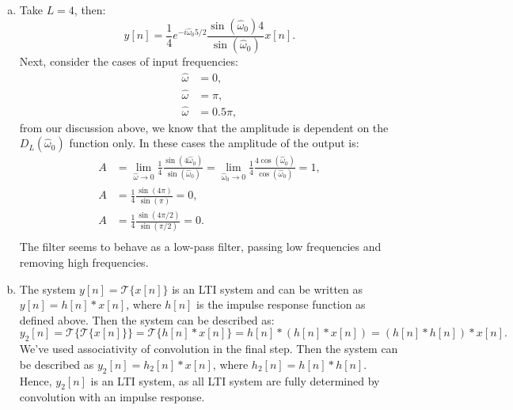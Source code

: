 \begin{enumerate}
\begin{enumerate}[a)]
\item Take $L=4$, then:
$$y[n]=\frac{1}{4}e^{-i\hat{\omega}_{0}5/2}\frac{\sin(\hat{\omega}_{0})4}{\sin(\hat{\omega}_{0})}x[n].$$
Next, consider the cases of input frequencies:
\begin{align*}
    \hat{\omega}&=0,\\
    \hat{\omega}&=\pi,\\
    \hat{\omega}&=0.5\pi,
\end{align*}
from our discussion above, we know that the amplitude is dependent on the $D_{L}(\hat{\omega}_{0})$ function only. 
In these cases the amplitude of the output is:
\begin{align*}
    A&=\lim_{\hat{\omega}\to 0}\frac{1}{4}\frac{\sin(4\hat{\omega}_{0})}{\sin(\hat{\omega}_{0})} = \lim_{\hat{\omega}_{0}\to 0}\frac{1}{4}\frac{4\cos(\hat{\omega}_{0})}{\cos(\hat{\omega}_{0})} = 1, \\
    A&=\frac{1}{4}\frac{\sin(4\pi)}{\sin(\pi)} = 0,\\
    A&=\frac{1}{4}\frac{\sin(4\pi/2)}{\sin(\pi/2)} = 0.\\
\end{align*}
The filter seems to behave as a low-pass filter, passing low frequencies and removing high frequencies. 

\item The system $y[n]=\mathcal{T}\{x[n]\}$ is an LTI system and can be written as $y[n]=h[n]*x[n]$, where $h[n]$ is the impulse response function as defined above. 
Then the system can be described as:
$$y_{2}[n]=\mathcal{T}\{\mathcal{T}\{x[n]\}\}=\mathcal{T}\{h[n]*x[n]\}=h[n]*(h[n]*x[n])=(h[n]*h[n])*x[n].$$
We've used associativity of convolution in the final step. Then the system can be described as $y_{2}[n]=h_{2}[n]*x[n]$, 
where $h_{2}[n]=h[n]*h[n]$. Hence, $y_{2}[n]$ is an LTI system, as all LTI system are fully determined by convolution with an impulse response. 


\end{enumerate}
\end{enumerate}
